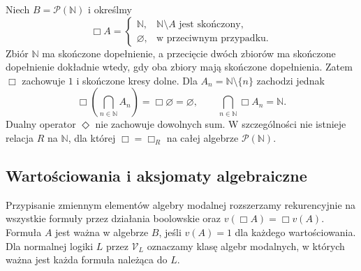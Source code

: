 \begin{przyklad}
\label{ex:ncl-modal-noncomplete-additivity}
Niech $B=\mathcal P(\mathbb N)$ i określmy
\[
 \Box A=
 \begin{cases}
 \mathbb N,&\mathbb N\setminus A\text{ jest skończony},\\
 \varnothing,&\text{w przeciwnym przypadku}.
 \end{cases}
\]
Zbiór $\mathbb N$ ma skończone dopełnienie,
a przecięcie dwóch zbiorów ma skończone
dopełnienie dokładnie wtedy, gdy oba zbiory
mają skończone dopełnienia. Zatem $\Box$
zachowuje $1$ i skończone kresy dolne.
Dla $A_n=\mathbb N\setminus\{n\}$ zachodzi jednak
\[
 \Box\left(\bigcap_{n\in\mathbb N}A_n\right)
 =\Box\varnothing=\varnothing,\qquad
 \bigcap_{n\in\mathbb N}\Box A_n=\mathbb N.
\]
Dualny operator $\Diamond$ nie zachowuje
dowolnych sum. W szczególności nie istnieje
relacja $R$ na $\mathbb N$, dla której
$\Box=\Box_R$ na całej algebrze $\mathcal P(\mathbb N)$.
\end{przyklad}

\subsection{Wartościowania i aksjomaty algebraiczne}

\begin{definicja}
\label{def:ncl-modal-algebra-valuation}
Przypisanie zmiennym elementów algebry modalnej
rozszerzamy rekurencyjnie na wszystkie formuły
przez działania boolowskie oraz
$v(\Box A)=\Box v(A)$.
Formuła $A$ jest ważna w algebrze $B$, jeśli
$v(A)=1$ dla każdego wartościowania.
Dla normalnej logiki $L$ przez $\mathcal V_L$
oznaczamy klasę algebr modalnych, w których
ważna jest każda formuła należąca do $L$.
\end{definicja}

